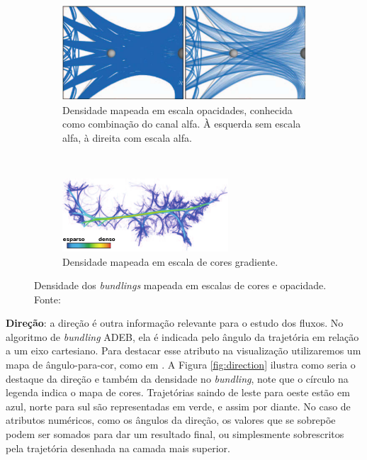 \begin{figure}[ht!]
  \centering
  \begin{subfigure}[t]{\textwidth}
    \centering
    \includegraphics[width=\textwidth]{../figuras/alpha-blending.pdf}
    \caption{Densidade mapeada em escala opacidades, conhecida como combinação do canal alfa. À esquerda sem escala alfa, à direita com escala alfa.}
  \end{subfigure}
  ~
  \begin{subfigure}[t]{\textwidth}
    \centering
    \includegraphics[width=\textwidth]{../figuras/color-density.pdf}
    \caption{Densidade mapeada em escala de cores gradiente.}
  \end{subfigure}

  \caption[Densidade dos \emph{bundlings} mapeada em escalas de cores e
  opacidade.]{Densidade dos \emph{bundlings} mapeada em escalas de cores e
  opacidade. Fonte: \citet{Lhuillier2017} \label{fig:density-mappings}}
\end{figure}

\textbf{Direção}: a direção é outra informação relevante para o estudo dos
fluxos.  No algoritmo de \emph{bundling} ADEB, ela é indicada pelo ângulo da
trajetória em relação a um eixo cartesiano. Para destacar esse atributo na
visualização utilizaremos um mapa de ângulo-para-cor, como em
\citet{ZegarraFlores2016}. A Figura \ref{fig:direction} ilustra como seria o
destaque da direção e também da densidade no \emph{bundling}, note que o círculo na
legenda indica o mapa de cores. Trajetórias saindo de leste para oeste estão em
azul, norte para sul são representadas em verde, e assim por diante. No caso de
atributos numéricos, como os ângulos da direção, os valores que se sobrepõe
podem ser somados para dar um resultado final, ou simplesmente sobrescritos
pela trajetória desenhada na camada mais superior.

